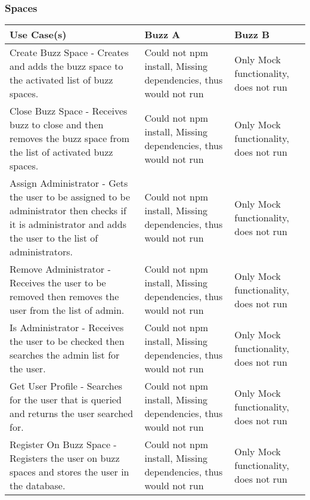 \documentclass[12pt]{article}
\begin{document}
\subsubsection{Spaces}%
\begin{tabular}{|p{4.5cm}|p{4.5cm}|p{4.5cm}|}

\hline
Use Case(s) & Buzz A & Buzz B \\ 
\hline
Create Buzz Space - Creates and adds the buzz space to the activated list of buzz spaces. & Could not npm install, Missing dependencies, thus would not run & Only Mock functionality, does not run \\ 
\hline
Close Buzz Space - Receives buzz to close and then removes the buzz space from the list of activated buzz spaces. & Could not npm install, Missing dependencies, thus would not run & Only Mock functionality, does not run\\ %
\hline
Assign Administrator - Gets the user to be assigned to be administrator then checks if it is administrator and adds the user to the list of administrators.  & Could not npm install, Missing dependencies, thus would not run & Only Mock functionality, does not run\\ %
\hline
Remove Administrator - Receives the user to be removed then removes the user from the list of admin. & Could not npm install, Missing dependencies, thus would not run & Only Mock functionality, does not run\\ %
\hline
Is Administrator - Receives the user to be checked then searches the admin list for the user.  & Could not npm install, Missing dependencies, thus would not run & Only Mock functionality, does not run\\ %
\hline
Get User Profile - Searches for the user that is queried and returns the user searched for. & Could not npm install, Missing dependencies, thus would not run & Only Mock functionality, does not run\\ %
\hline
Register On Buzz Space - Registers the user on buzz spaces and stores the user in the database. & Could not npm install, Missing dependencies, thus would not run & Only Mock functionality, does not run\\ %
\hline


\end{tabular}
\end{document}
